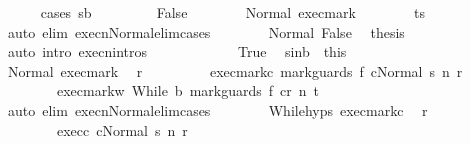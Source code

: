\begin{isabellebody}
\ \ \ \ \isamarkupfalse%
\ {\isacharparenleft}cases\ {\isachardoublequoteopen}s{\isacharprime}{\isasymin}b{\isachardoublequoteclose}{\isacharparenright}\ \isanewline
\ \ \ \ \ \ \isamarkupfalse%
\ False\isanewline
\ \ \ \ \ \ \isamarkupfalse%
\ Normal\ exec{\isacharunderscore}mark\isanewline
\ \ \ \ \ \ \isamarkupfalse%
\ {\isachardoublequoteopen}t{\isacharequal}s{\isachardoublequoteclose}\isanewline
\ \ \ \ \ \ \ \ \isamarkupfalse%
\ {\isacharparenleft}auto\ elim{\isacharcolon}\ execn{\isacharunderscore}Normal{\isacharunderscore}elim{\isacharunderscore}cases{\isacharparenright}\isanewline
\ \ \ \ \ \ \isamarkupfalse%
\ Normal\ False\ \isamarkupfalse%
\ {\isacharquery}thesis\isanewline
\ \ \ \ \ \ \ \ \isamarkupfalse%
\ {\isacharparenleft}auto\ intro{\isacharcolon}\ execn{\isachardot}intros{\isacharparenright}\isanewline
\ \ \ \ \isamarkupfalse%
\isanewline
\ \ \ \ \ \ \isamarkupfalse%
\ True\ \isamarkupfalse%
\ s{\isacharprime}{\isacharunderscore}in{\isacharunderscore}b\ {\isacharequal}\ this\isanewline
\ \ \ \ \ \ \isamarkupfalse%
\ Normal\ exec{\isacharunderscore}mark\ \isamarkupfalse%
\ r\ \isanewline
\ \ \ \ \ \ \ \ exec{\isacharunderscore}mark{\isacharunderscore}c{\isacharcolon}\ {\isachardoublequoteopen}{\isasymGamma}{\isasymturnstile}{\isasymlangle}mark{\isacharunderscore}guards\ f\ c{\isacharcomma}Normal\ s{\isacharprime}{\isasymrangle}\ {\isacharequal}n{\isasymRightarrow}\ r{\isachardoublequoteclose}\ \isanewline
\ \ \ \ \ \ \ \ exec{\isacharunderscore}mark{\isacharunderscore}w{\isacharcolon}\ {\isachardoublequoteopen}{\isasymGamma}{\isasymturnstile}{\isasymlangle}While\ b\ {\isacharparenleft}mark{\isacharunderscore}guards\ f\ c{\isacharparenright}{\isacharcomma}r{\isasymrangle}\ {\isacharequal}n{\isasymRightarrow}\ t{\isachardoublequoteclose}\isanewline
\ \ \ \ \ \ \ \ \isamarkupfalse%
\ {\isacharparenleft}auto\ elim{\isacharcolon}\ execn{\isacharunderscore}Normal{\isacharunderscore}elim{\isacharunderscore}cases{\isacharparenright}\isanewline
\ \ \ \ \ \ \isamarkupfalse%
\ While{\isachardot}hyps\ exec{\isacharunderscore}mark{\isacharunderscore}c\ \isamarkupfalse%
\ r{\isacharprime}\ \ \isanewline
\ \ \ \ \ \ \ \ exec{\isacharunderscore}c{\isacharcolon}\ {\isachardoublequoteopen}{\isasymGamma}{\isasymturnstile}{\isasymlangle}c{\isacharcomma}Normal\ s{\isacharprime}{\isasymrangle}\ {\isacharequal}n{\isasymRightarrow}\ r{\isacharprime}{\isachardoublequoteclose}\ \isanewline

\end{isabellebody}
